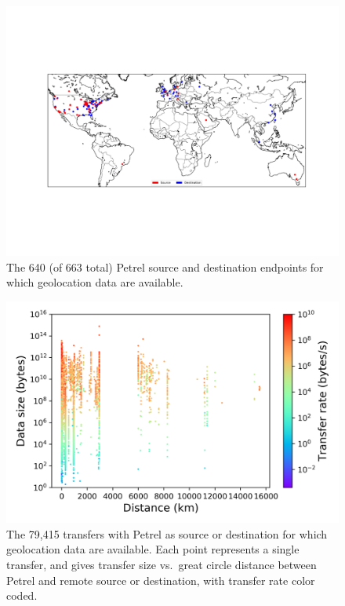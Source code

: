 \documentclass[sigconf]{acmart}
\begin{document}
\begin{figure}
\centering
\includegraphics[trim=2in 3.3in 1.4in 3in,clip,width=\columnwidth]{Figures/petrel-src-dst-map-3.png}

\vspace{-1ex}

\caption{The 640 (of 663 total) Petrel source and destination endpoints for which geolocation
data are available.\label{fig:usage1}}
\end{figure}


\begin{figure}
\centering
\includegraphics[trim=0.19in 0.1in 0.2in 0.1in,clip,width=\columnwidth]{Figures/size-distance-speed.png}

\vspace{-2ex}

\caption{The 79,415 transfers with Petrel as source or destination
for which geolocation data are available. Each point represents a single transfer,
and gives transfer size vs.\ great circle distance between Petrel and remote source or destination, 
with transfer rate color coded.\label{fig:usage2}}
\end{figure}
\end{document}
